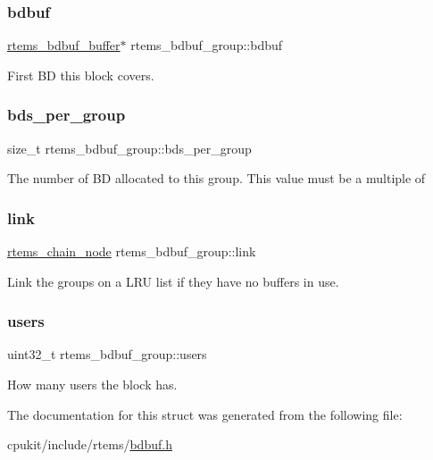 \subsubsection{\texorpdfstring{bdbuf}{bdbuf}}
{\footnotesize\ttfamily \mbox{\hyperlink{structrtems__bdbuf__buffer}{rtems\+\_\+bdbuf\+\_\+buffer}}$\ast$ rtems\+\_\+bdbuf\+\_\+group\+::bdbuf}

First BD this block covers. \mbox{\label{structrtems__bdbuf__group_aa2685ccbf18c17cf198bc693ad39d88e}} 
\subsubsection{\texorpdfstring{bds\_per\_group}{bds\_per\_group}}
{\footnotesize\ttfamily size\+\_\+t rtems\+\_\+bdbuf\+\_\+group\+::bds\+\_\+per\+\_\+group}

The number of BD allocated to this group. This value must be a multiple of
\begin{DoxyEnumerate}
\item 
\end{DoxyEnumerate}\mbox{\label{structrtems__bdbuf__group_ae9b643a68f9d310d91debdc16a67a1d7}} 
\subsubsection{\texorpdfstring{link}{link}}
{\footnotesize\ttfamily \mbox{\hyperlink{structChain__Node__struct}{rtems\+\_\+chain\+\_\+node}} rtems\+\_\+bdbuf\+\_\+group\+::link}

Link the groups on a L\+RU list if they have no buffers in use. \mbox{\label{structrtems__bdbuf__group_a6b31ff5ee2f074ce8973f7df789f84c1}} 
\subsubsection{\texorpdfstring{users}{users}}
{\footnotesize\ttfamily uint32\+\_\+t rtems\+\_\+bdbuf\+\_\+group\+::users}

How many users the block has. 

The documentation for this struct was generated from the following file\+:\begin{DoxyCompactItemize}
\item 
cpukit/include/rtems/\mbox{\hyperlink{bdbuf_8h}{bdbuf.\+h}}\end{DoxyCompactItemize}
